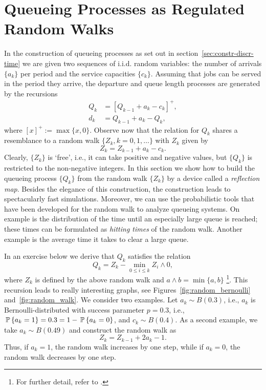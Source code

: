 \section{Queueing Processes as Regulated Random Walks}
\label{sec:queu-proc-as}

In the construction of queueing processes as set out in
section~\ref{sec:constr-discr-time} we are given two sequences of
i.i.d. random variables: the number of arrivals $\{a_k\}$ per period
and the service capacities $\{c_k\}$. Assuming that jobs can be served
in the period they arrive, the departure and queue length processes
are generated by the recursions
\begin{equation}\label{eq:5}
  \begin{split}
  Q_k &= [Q_{k-1}+a_k - c_k]^+,\\
  d_k &= Q_{k-1} +a_k- Q_{k},
  \end{split}
\end{equation}
where $[x]^+ := \max\{x, 0\}$.  Observe now that the relation for $Q_k$
shares a resemblance to a random walk $\{Z_k, k=0,1,\ldots\}$ with  $Z_k$ 
given by
\begin{equation*}
  Z_k = Z_{k-1} + a_k - c_k.
\end{equation*}
Clearly, $\{Z_k\}$ is `free', i.e., it can take positive and negative
values, but $\{Q_k\}$ is restricted to the non-negative integers.  In
this section we show how to build the queueing process $\{Q_k\}$ from
the random walk $\{Z_k\}$ by a device called a \emph{reflection map}.
Besides the elegance of this construction, the construction leads to
spectacularly fast simulations. Moreover, we can use the probabilistic
tools that have been developed for the random walk to analyze queueing
systems. On example is the distribution of the time until an
especially large queue is reached; these times can be formulated as
\emph{hitting times} of the random walk. Another example is the
average time it takes to clear a large queue.

In an exercise  below we derive that $Q_k$ satisfies the relation
\begin{equation}\label{eq:reich1}
  Q_k = Z_k - \min_{0\leq i \leq k} Z_i\wedge 0,
\end{equation}
where $Z_k$ is defined by the above random walk and
$a\wedge b = \min\{a,b\}$ \footnote{For further detail, refer to
  \citet{baccelli88:_sampl_m_m}.}.  This recursion leads to really
interesting graphs, see Figures~\ref{fig:random_bernoulli}
and~\ref{fig:random_walk}. We consider two examples. Let
$a_k \sim B(0.3)$, i.e., $a_k$ is Bernoulli-distributed with success
parameter $p=0.3$, i.e., $\P{a_k = 1} = 0.3 = 1- \P{a_k=0}$, and
$c_k \sim B(0.4)$. As a second example, we take $a_k\sim B(0.49)$ and
construct the random walk as
\begin{equation*}
  Z_k = Z_{k-1} + 2 a_k -1.
\end{equation*}
Thus, if $a_k=1$, the random walk increases by one step, while if
$a_k=0$, the random walk decreases by one step. 


